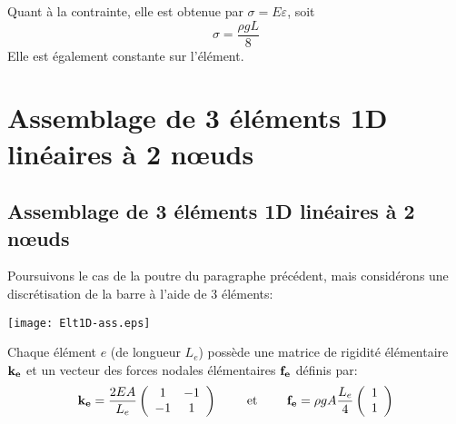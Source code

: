 Quant à la contrainte, elle est obtenue par $\sigma=E\varepsilon$, soit
\begin{equation}\sigma=\frac{\rho g L}8\end{equation} Elle est également constante sur l'élément.












\medskip
\ifVersionAvecExemplesSepares
   \section{Assemblage de 3 éléments 1D linéaires à 2 nœuds}\label{Sec-ass}
\else
   \subsection{Assemblage de 3 éléments 1D linéaires à 2 nœuds}\label{Sec-ass}
\fi

Poursuivons le cas de la poutre du paragraphe précédent, mais considérons une discrétisation
de la barre à l'aide de 3 éléments:\\

\centerline{\texttt{[image: Elt1D-ass.eps]}}


\medskip
Chaque élément $e$ (de longueur $L_e$) possède une matrice de rigidité élémentaire $\mathbf{k_e}$ 
et un vecteur des forces nodales élémentaires $\mathbf{f_e}$ définis par:
\begin{equation}
\mathbf{k_e} = \frac{2EA}{L_e} \left(  \begin{array}{cc} 1 & -1\\ -1& 1 \end{array}\right)
\qquad \text{ et } \qquad
\mathbf{f_e} = \rho g A \frac{L_e}4 \left(  \begin{array}{c} 1 \\1 \end{array}\right)
\end{equation}

